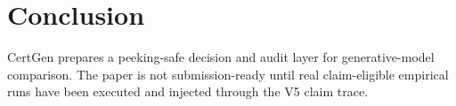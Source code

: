 \section{Conclusion}

CertGen prepares a peeking-safe decision and audit layer for generative-model comparison. The paper is not submission-ready until real claim-eligible empirical runs have been executed and injected through the V5 claim trace.
